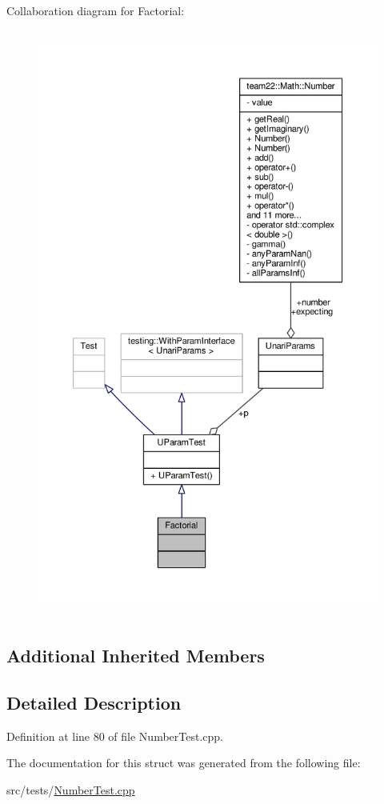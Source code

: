 Collaboration diagram for Factorial\+:
\nopagebreak
\begin{figure}[H]
\begin{center}
\leavevmode
\includegraphics[height=550pt]{struct_factorial__coll__graph}
\end{center}
\end{figure}
\subsection*{Additional Inherited Members}


\subsection{Detailed Description}


Definition at line 80 of file Number\+Test.\+cpp.



The documentation for this struct was generated from the following file\+:\begin{DoxyCompactItemize}
\item 
src/tests/\hyperlink{_number_test_8cpp}{Number\+Test.\+cpp}\end{DoxyCompactItemize}
